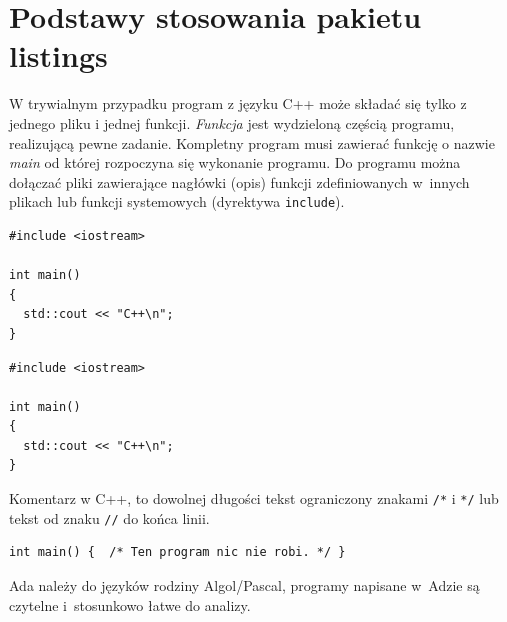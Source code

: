 \documentclass[a4paper,11pt]{article}
\begin{document}
\section{Podstawy stosowania pakietu listings}


W trywialnym przypadku program z języku C++ może składać się tylko z jednego pliku i jednej funkcji. \emph{Funkcja} jest wydzieloną częścią programu, realizującą pewne zadanie.  Kompletny program musi \mbox{zawierać} funkcję o nazwie \emph{main} od której rozpoczyna się wykonanie programu. Do programu można dołączać pliki zawierające nagłówki (opis) funkcji zdefiniowanych w~innych plikach lub funkcji systemowych (dyrektywa \verb!include!).

\vspace{15mm}

\begin{verbatim}
#include <iostream>

int main()
{
  std::cout << "C++\n";
}
\end{verbatim}


\begin{lstlisting}
#include <iostream>

int main()
{
  std::cout << "C++\n";
}
\end{lstlisting}


Komentarz w C++, to dowolnej długości tekst ograniczony znakami \lstinline!/*! i \lstinline!*/! lub tekst od znaku \lstinline!//! do końca linii.

\begin{lstlisting}[numbers=none]
int main() {  /* Ten program nic nie robi. */ }
\end{lstlisting}


Ada należy do języków rodziny Algol/Pascal, programy napisane w~Adzie są czytelne i~stosunkowo łatwe do analizy.
\end{document}
